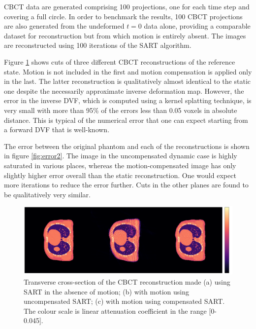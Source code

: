 CBCT data are generated comprising 100 projections, one for each time step and covering a full circle.  In order to benchmark the results, 100 CBCT projections are also generated from the undeformed $t=0$ data alone, providing a comparable dataset for reconstruction but from which motion is entirely absent.  The images are reconstructed using 100 iterations of the SART algorithm.

Figure \ref{fig:result21} shows cuts of three different CBCT reconstructions of the reference state.  Motion is not included in the first and motion compensation is applied only in the last.  The latter reconstruction is qualitatively almost identical to the static one despite the necessarily approximate inverse deformation map.  However, the error in the inverse DVF, which is computed using a kernel splatting technique, is very small with more than 95\% of the errors less than 0.05 voxels in absolute distance.  This is typical of the numerical error that one can expect starting from a forward DVF that is well-known.

The error between the original phantom and each of the reconstructions is shown in figure \ref{fig:error2}.  The image in the uncompensated dynamic case is highly saturated in various places, whereas the motion-compensated image has only slightly higher error overall than the static reconstruction.  One would expect more iterations to reduce the error further.  Cuts in the other planes are found to be qualitatively very similar.

\begin{figure}[ht]
\begin{center}
\includegraphics[width=1\linewidth]{MotionCorrection/motion2XCAT2.png}
\hspace{0.1cm}{\footnotesize (a)}\hspace{4.3cm}{\footnotesize (b)}\hspace{4.3cm}{\footnotesize (c)}
\caption{\label{fig:result21} Transverse cross-section of the CBCT reconstruction made (a) using SART in the absence of motion; (b) with motion using uncompensated SART; (c) with motion using compensated SART. The colour scale is linear attenuation coefficient in the range [0-0.045].} 
\end{center}
\end{figure}


